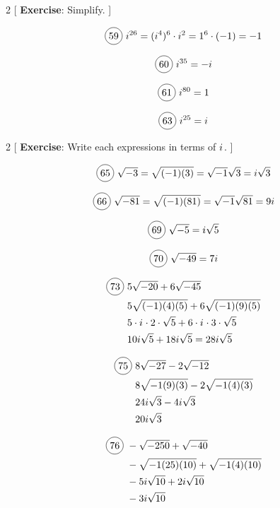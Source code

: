 \newpage

\begin{multicols}{2}
[
  \textbf{Exercise}: Simplify.
]

\begin{align*}
  \circled{59}\ i^{26}=(i^{4})^{6}\cdot i^{2}=1^{6}\cdot(-1)=-1
\end{align*}

  \[\circled{60}\ i^{35}=-i\]

  \[\circled{61}\ i^{80}=1\]

  \[\circled{63}\ i^{25}=\iu\]
\end{multicols}

\vspace{.5cm}

\begin{multicols}{2}
[
  \textbf{Exercise}: Write each expressions in terms of ${i\mkern1mu}$.
]

\begin{align*}
  \circled{65}\ \sqrt{-3}=\sqrt{(-1)(3)}=\sqrt{-1}\sqrt{3}=i\sqrt{3}
\end{align*}

\begin{align*}
  \circled{66}\ \sqrt{-81}=\sqrt{(-1)(81)}=\sqrt{-1}\sqrt{81}=9i
\end{align*}

  \[\circled{69}\ \sqrt{-5}=i\sqrt{5}\]

  \[\circled{70}\ \sqrt{-49}=7i\]

\begin{align*}
  \circled{73}\ &5\sqrt{-20}+6\sqrt{-45}\\
  &5\sqrt{(-1)(4)(5)}+6\sqrt{(-1)(9)(5)}\\
  &5\cdot \iu \cdot 2 \cdot \sqrt{5}+6\cdot \iu \cdot 3 \cdot \sqrt{5}\\
  &10i\sqrt{5}+18i\sqrt{5}=28i\sqrt{5}
\end{align*}

\begin{align*}
  \circled{75}\ &8\sqrt{-27}-2\sqrt{-12}\\
  &8\sqrt{-1(9)(3)}-2\sqrt{-1(4)(3)}\\
  &24i\sqrt{3}-4i\sqrt{3}\\
  &20i\sqrt{3}
\end{align*}

\begin{align*}
  \circled{76}\ &-\sqrt{-250}+\sqrt{-40}\\
  &-\sqrt{-1(25)(10)}+\sqrt{-1(4)(10)}\\
  &-5i\sqrt{10}+2i\sqrt{10}\\
  &-3i\sqrt{10}
\end{align*}

\end{multicols}

